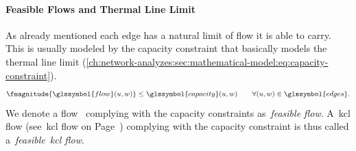 \paragraph{Feasible Flows and Thermal Line Limit}
\label{ch:network-analyzes:sec:mathematical-model:paragraph:capacity}
% 
As already mentioned each edge has a natural limit of flow it is able to carry.
This is usually modeled by the capacity constraint that basically models the
thermal line limit
(\cref{ch:network-analyzes:sec:mathematical-model:eq:capacity-constraint}).
%
\begin{align}
    \fmagnitude{\glssymbol{flow}(\vertexa,\vertexc)}
    \leq
    \glssymbol{capacity}(\vertexa,\vertexc)
    \qquad
    \forall(\vertexa,\vertexc)\in\glssymbol{edges}.
    \label{ch:network-analyzes:sec:mathematical-model:eq:capacity-constraint}
\end{align}
%
We denote a flow~ complying with the capacity constraints
as~\emph{feasible flow}. A~\gls{kcl} flow (see~\gls{kcl} flow on
Page~\pageref{ch:network-analyzes:sec:mathematical-model:paragraph:kcl-flow})
complying with the capacity constraint is thus called a~\emph{feasible~\gls{kcl}
flow}.
% 
